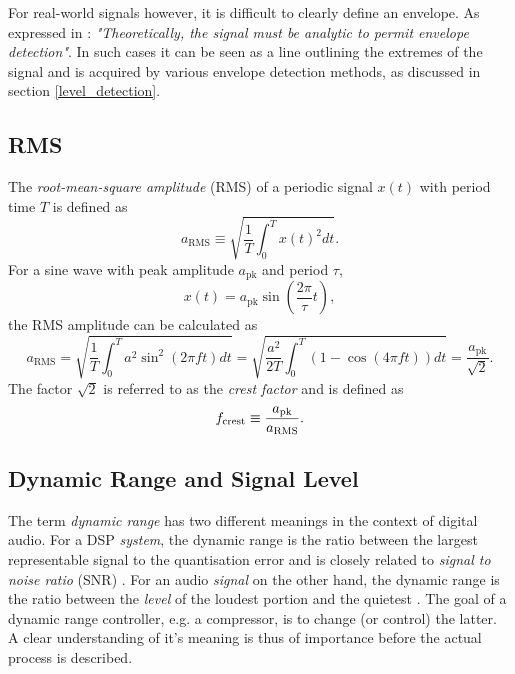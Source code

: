 \documentclass[../main2.tex]{subfiles}
\begin{document}
For real-world signals however, it is difficult to clearly define an envelope. As expressed in \cite{bedrosian1962analytic}: \emph{"Theoretically, the signal must be analytic to permit envelope detection"}. In such cases it can be seen as a line outlining the extremes of the signal and is acquired by various envelope detection methods, as discussed in section \ref{level_detection}. 
\subsection{RMS}
The \emph{root-mean-square amplitude} (RMS) of a periodic signal $x(t)$ with period time $T$ is defined as
\begin{equation}
a_\text{RMS} \equiv \sqrt{ \frac{1}{T} \int_{0}^{T} x(t)^2 dt }.
\end{equation}
For a sine wave with peak amplitude $a_\text{pk}$ and period $\tau$,
\begin{equation}\label{eq:sine_wave}
x(t) = a_\text{pk} \sin \left( \frac{2 \pi}{\tau}t \right), 
\end{equation}
the RMS amplitude can be calculated as
\begin{equation}\label{eq:a_RMS}
a_\text{RMS} =
\sqrt{ \frac{1}{T} \int_{0}^{T} a^2 \sin^2 (2 \pi f t) dt } =
\sqrt{ \frac{a^2}{2T} \int_{0}^{T}\left( 1 - \cos (4 \pi f t) \right) dt } =
\frac{a_\text{pk}}{\sqrt 2}.
\end{equation}
The factor $\sqrt 2$ is referred to as the \emph{crest factor} and is defined as
\begin{align}
f_\text{crest} \equiv \frac{a_\text{pk}}{a_\text{RMS}}. \label{eq:crest_factor}
\end{align}

\subsection{Dynamic Range and Signal Level}\label{theory_dynamic_range}
The term \emph{dynamic range} has two different meanings in the context of digital audio. For a DSP \emph{system}, the dynamic range is the ratio between the largest representable signal to the quantisation error and is closely related to \emph{signal to noise ratio} (SNR)  \cite{wilson1993filter}. For an audio \emph{signal} on the other hand, the dynamic range is the ratio between the \emph{level} of the loudest portion and the quietest \cite{davis1989sound}. The goal of a dynamic range controller, e.g. a compressor, is to change (or control) the latter. A clear understanding of it's meaning is thus of importance before the actual process is described. 
\end{document}
